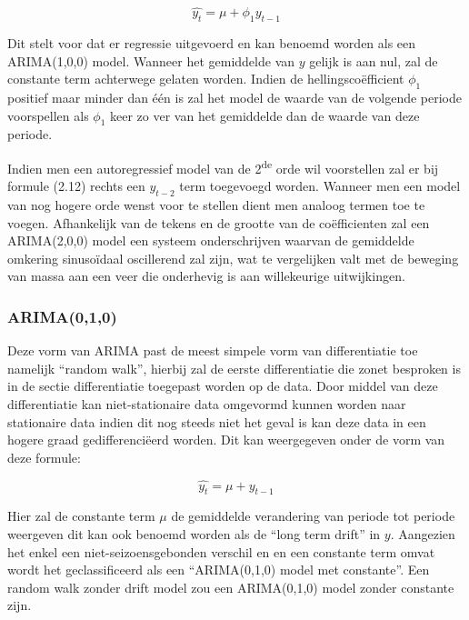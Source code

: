 \begin{equation}
\hat{y_t} = \mu + \phi_1 y_{t-1}
\end{equation}

Dit stelt voor dat er regressie uitgevoerd en kan benoemd worden als een ARIMA(1,0,0) model. Wanneer het gemiddelde van $y$ gelijk is aan nul, zal de constante term achterwege gelaten worden. Indien de hellingsco\"{e}fficient $\phi_1$ positief maar minder dan \'{e}\'{e}n is zal het model de waarde van de volgende periode voorspellen als $\phi_1$ keer zo ver van het gemiddelde dan de waarde van deze periode. 

Indien men een autoregressief model van de 2\textsuperscript{de} orde wil voorstellen zal er bij formule (2.12) rechts een $y_{t-2}$ term toegevoegd worden. Wanneer men een model van nog hogere orde wenst voor te stellen dient men analoog termen toe te voegen. Afhankelijk van de tekens en de grootte van de co\"{e}fficienten zal een ARIMA(2,0,0) model een systeem onderschrijven waarvan de gemiddelde omkering sinuso\"{i}daal oscillerend zal zijn, wat te vergelijken valt met de beweging van massa aan een veer die onderhevig is aan willekeurige uitwijkingen.


\subsubsection{ARIMA(0,1,0)}

Deze vorm van ARIMA past de meest simpele vorm van differentiatie toe namelijk ``random walk'', hierbij zal de eerste differentiatie die zonet besproken is in de sectie differentiatie toegepast worden op de data. Door middel van deze differentiatie kan niet-stationaire data omgevormd kunnen worden naar stationaire data indien dit nog steeds niet het geval is kan deze data in een hogere graad gedifferenci\"{e}erd worden. Dit kan weergegeven onder de vorm van deze formule:

\begin{equation}
\hat{y_t} = \mu + y_{t-1}
\end{equation}

Hier zal de constante term $\mu$ de gemiddelde verandering van periode tot periode weergeven dit kan ook benoemd worden als de ``long term drift'' in $y$. Aangezien het enkel een niet-seizoensgebonden verschil en en een constante term omvat wordt het geclassificeerd als een ``ARIMA(0,1,0) model met constante''. Een random walk zonder drift model zou een ARIMA(0,1,0) model zonder constante zijn.


